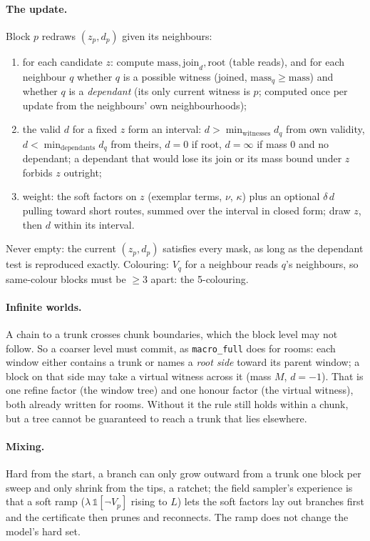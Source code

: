 \documentclass[11pt]{article}
\newcommand{\1}{\mathds{1}}
\begin{document}
\paragraph{The update.} Block $p$ redraws $(z_p, d_p)$ given its neighbours:
\begin{enumerate}
  \item for each candidate $z$: compute $\mathrm{mass}, \mathrm{join}_d, \mathrm{root}$ (table
        reads), and for each neighbour $q$ whether $q$ is a possible witness
        ($\mathrm{joined}$, $\mathrm{mass}_q \ge \mathrm{mass}$) and whether $q$ is a
        \emph{dependant} (its only current witness is $p$; computed once per update
        from the neighbours' own neighbourhoods);
  \item the valid $d$ for a fixed $z$ form an interval: $d > \min_{\text{witnesses}} d_q$
        from own validity, $d < \min_{\text{dependants}} d_q$ from theirs, $d = 0$ if
        root, $d = \infty$ if mass $0$ and no dependant; a dependant that would lose
        its join or its mass bound under $z$ forbids $z$ outright;
  \item weight: the soft factors on $z$ (exemplar terms, $\nu$, $\kappa$) plus an
        optional $\delta\, d$ pulling toward short routes, summed over the interval
        in closed form; draw $z$, then $d$ within its interval.
\end{enumerate}
Never empty: the current $(z_p, d_p)$ satisfies every mask, as long as the
dependant test is reproduced exactly. Colouring: $V_q$ for a neighbour reads
$q$'s neighbours, so same-colour blocks must be $\ge 3$ apart: the 5-colouring.

\paragraph{Infinite worlds.} A chain to a trunk crosses chunk boundaries, which
the block level may not follow. So a coarser level must commit, as
\texttt{macro\_full} does for rooms: each window either contains a trunk or
names a \emph{root side} toward its parent window; a block on that side may take
a virtual witness across it (mass $M$, $d = -1$). That is one refine factor
(the window tree) and one honour factor (the virtual witness), both already
written for rooms. Without it the rule still holds within a chunk, but a tree
cannot be guaranteed to reach a trunk that lies elsewhere.

\paragraph{Mixing.} Hard from the start, a branch can only grow outward from a
trunk one block per sweep and only shrink from the tips, a ratchet; the field
sampler's experience is that a soft ramp ($\lambda\, \1[\lnot V_p]$ rising to $L$)
lets the soft factors lay out branches first and the certificate then prunes
and reconnects. The ramp does not change the model's hard set.
\end{document}
